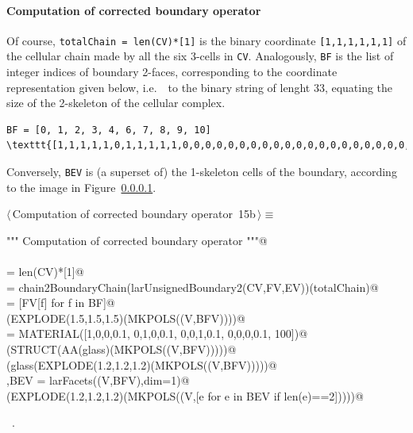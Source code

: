 \documentclass[11pt,oneside]{article}    %
\begin{document}
\paragraph{Computation of corrected boundary operator}
Of course, \texttt{totalChain = len(CV)*[1]} is the binary coordinate \texttt{[1,1,1,1,1,1]}
of the cellular chain made by all the six 3-cells in \texttt{CV}.
Analogously, \texttt{BF} is the list of integer indices of boundary 2-faces, corresponding to the coordinate representation given below, i.e.~~to the binary string of lenght 33, equating the size of the 2-skeleton of the cellular complex.
\begin{verbatim}
BF = [0, 1, 2, 3, 4, 6, 7, 8, 9, 10]
\texttt{[1,1,1,1,1,0,1,1,1,1,1,0,0,0,0,0,0,0,0,0,0,0,0,0,0,0,0,0,0,0,0,0,0]}
\end{verbatim}
Conversely, \texttt{BEV} is (a superset of) the 1-skeleton cells of the boundary, according to the image in Figure~\ref{}.

\begin{flushleft} \small \label{scrap25}
\protect{}$\langle\,$Computation of corrected boundary operator\nobreak\ {\footnotesize 15b}$\,\rangle\equiv$
\vspace{-1ex}
\begin{list}{}{} \item
\mbox{}\verb@""" Computation of corrected boundary operator """@\\
\mbox{}\verb@@\\
\mbox{}\verb@totalChain = len(CV)*[1]@\\
\mbox{}\verb@BF = chain2BoundaryChain(larUnsignedBoundary2(CV,FV,EV))(totalChain)@\\
\mbox{}\verb@BFV = [FV[f] for f in BF]@\\
\mbox{}\verb@VIEW(EXPLODE(1.5,1.5,1.5)(MKPOLS((V,BFV))))@\\
\mbox{}\verb@glass = MATERIAL([1,0,0,0.1,  0,1,0,0.1,  0,0,1,0.1, 0,0,0,0.1, 100])@\\
\mbox{}\verb@VIEW(STRUCT(AA(glass)(MKPOLS((V,BFV)))))@\\
\mbox{}\verb@VIEW(glass(EXPLODE(1.2,1.2,1.2)(MKPOLS((V,BFV)))))@\\
\mbox{}\verb@V,BEV = larFacets((V,BFV),dim=1)@\\
\mbox{}\verb@VIEW(EXPLODE(1.2,1.2,1.2)(MKPOLS((V,[e for e in BEV if len(e)==2]))))@\\
\mbox{}\verb@@{\NWsep}
\end{list}
\vspace{-1ex}
\footnotesize\addtolength{\baselineskip}{-1ex}
\begin{list}{}{\setlength{\itemsep}{-\parsep}\setlength{\itemindent}{-\leftmargin}}
\item \NWtxtMacroRefIn\ .
\end{list}
\end{flushleft}
\end{document}
